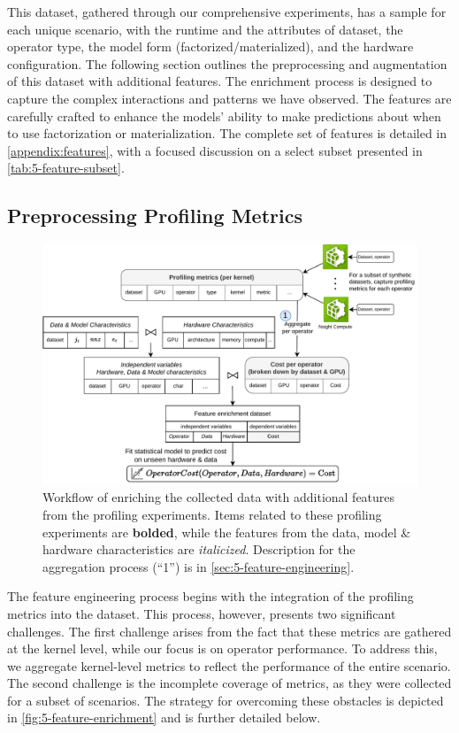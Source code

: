 This dataset, gathered through our comprehensive experiments, has a sample for each unique scenario, with the runtime and the attributes of dataset, the operator type, the model form (factorized/materialized), and the hardware configuration. The following section outlines the preprocessing and augmentation of this dataset with additional features. The enrichment process is designed to capture the complex interactions and patterns we have observed. The features are carefully crafted to enhance the models' ability to make predictions about when to use factorization or materialization. The complete set of features is detailed in \autoref{appendix:features}, with a focused discussion on a select subset presented in \autoref{tab:5-feature-subset}.

\subsection{Preprocessing Profiling Metrics}
\begin{figure}[ht]
  \centering
  \includegraphics[width=\linewidth]{chapters/05_cost_estimation/figures/feature-engineering.pdf}
  \caption[Feature enrichment workflow]{Workflow of enriching the collected data with additional features from the profiling experiments. Items related to these profiling experiments are \textbf{bolded}, while the features from the data, model \& hardware characteristics are \textit{italicized}. Description for the aggregation process (“1”) is in \autoref{sec:5-feature-engineering}.}
  \label{fig:5-feature-enrichment}
\end{figure}
The feature engineering process begins with the integration of the profiling metrics into the dataset. This process, however, presents two significant challenges. The first challenge arises from the fact that these metrics are gathered at the kernel level, while our focus is on operator performance. To address this, we aggregate kernel-level metrics to reflect the performance of the entire scenario. The second challenge is the incomplete coverage of metrics, as they were collected for a subset of scenarios. The strategy for overcoming these obstacles is depicted in \autoref{fig:5-feature-enrichment} and is further detailed below.

